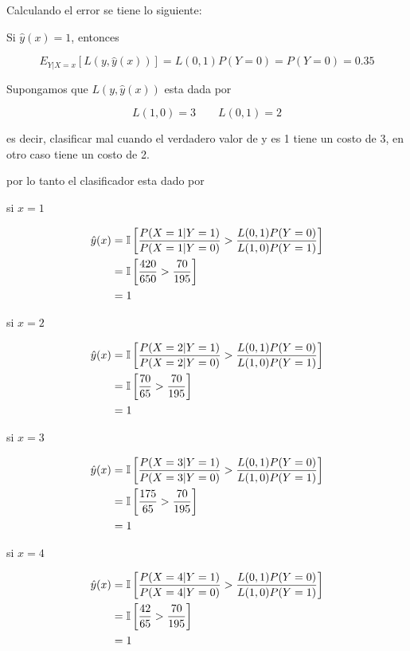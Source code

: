 Calculando el error se tiene lo siguiente:

Si $\hat{y}(x)=1$, entonces

\begin{equation*}
    E_{Y|X=x} [L(y,\hat{y}(x))] = L(0,1)P(Y=0) = P(Y=0) = 0.35
\end{equation*}

Supongamos que $L(y,\hat{y}(x))$ esta dada por

\begin{equation*}
    L(1,0) = 3 \qquad L(0,1) = 2
\end{equation*}

es decir, clasificar mal cuando el verdadero valor de y es 1 tiene un costo de 3, en otro caso tiene un costo de 2.

por lo tanto el clasificador esta dado por

si $x=1$

\begin{align*}
    \hat{y}(x) & = \mathbb{I} \left [\frac{P(X=1|Y=1)}{P(X=1|Y=0)} > \frac{L(0,1)P(Y=0)}{L(1,0)P(Y=1)}\right ] \\
               & = \mathbb{I} \left [\frac{420}{650}  > \frac{70}{195}\right ]                                 \\
               & = 1
\end{align*}

si $x=2$

\begin{align*}
    \hat{y}(x) & = \mathbb{I} \left [\frac{P(X=2|Y=1)}{P(X=2|Y=0)} > \frac{L(0,1)P(Y=0)}{L(1,0)P(Y=1)}\right ] \\
               & = \mathbb{I} \left [\frac{70}{65}  > \frac{70}{195}\right ]                                   \\
               & = 1
\end{align*}

si $x=3$

\begin{align*}
    \hat{y}(x) & = \mathbb{I} \left [\frac{P(X=3|Y=1)}{P(X=3|Y=0)} > \frac{L(0,1)P(Y=0)}{L(1,0)P(Y=1)}\right ] \\
               & = \mathbb{I} \left [\frac{175}{65}  > \frac{70}{195}\right ]                                  \\
               & = 1
\end{align*}

si $x=4$

\begin{align*}
    \hat{y}(x) & = \mathbb{I} \left [\frac{P(X=4|Y=1)}{P(X=4|Y=0)} > \frac{L(0,1)P(Y=0)}{L(1,0)P(Y=1)}\right ] \\
               & = \mathbb{I} \left [\frac{42}{65}  > \frac{70}{195}\right ]                                   \\
               & = 1
\end{align*}